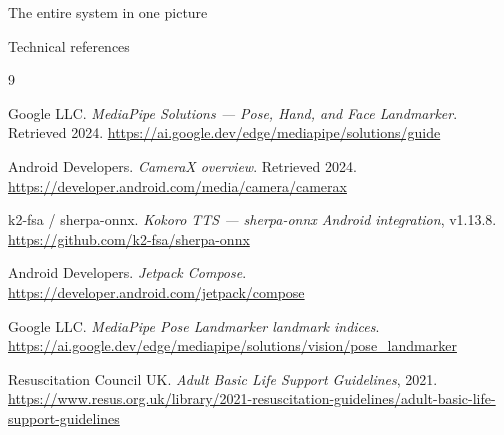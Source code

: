 \documentclass[aspectratio=169,t]{beamer}
\begin{document}
{\begin{frame}[plain]{The entire system in one picture}
\end{frame}
}

\begin{frame}[allowframebreaks]{Technical references}
\footnotesize
\begin{thebibliography}{9}

  Google LLC.
  \textit{MediaPipe Solutions — Pose, Hand, and Face Landmarker}.
  Retrieved 2024.
  \url{https://ai.google.dev/edge/mediapipe/solutions/guide}

  Android Developers.
  \textit{CameraX overview}.
  Retrieved 2024.
  \url{https://developer.android.com/media/camera/camerax}

  k2-fsa / sherpa-onnx.
  \textit{Kokoro TTS — sherpa-onnx Android integration}, v1.13.8.
  \url{https://github.com/k2-fsa/sherpa-onnx}

  Android Developers.
  \textit{Jetpack Compose}.
  \url{https://developer.android.com/jetpack/compose}

  Google LLC.
  \textit{MediaPipe Pose Landmarker landmark indices}.
  \url{https://ai.google.dev/edge/mediapipe/solutions/vision/pose_landmarker}

  Resuscitation Council UK.
  \textit{Adult Basic Life Support Guidelines}, 2021.
  \url{https://www.resus.org.uk/library/2021-resuscitation-guidelines/adult-basic-life-support-guidelines}

\end{thebibliography}
\end{frame}
\end{document}
